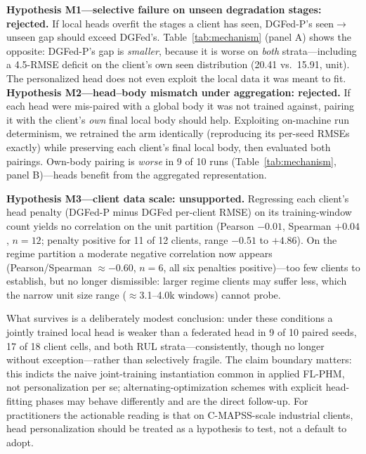\documentclass[journal]{IEEEtran}
\newcommand{\dgfed}{DGFed}
\begin{document}
\textbf{Hypothesis M1---selective failure on unseen degradation stages: rejected.} If local heads overfit the stages a client has seen, \dgfed{}-P's seen$\to$unseen gap should exceed \dgfed{}'s. Table~\ref{tab:mechanism} (panel A) shows the opposite: \dgfed{}-P's gap is \emph{smaller}, because it is worse on \emph{both} strata---including a 4.5-RMSE deficit on the client's own seen distribution (20.41 vs.\ 15.91, unit). The personalized head does not even exploit the local data it was meant to fit.
\textbf{Hypothesis M2---head--body mismatch under aggregation: rejected.} If each head were mis-paired with a global body it was not trained against, pairing it with the client's \emph{own} final local body should help. Exploiting on-machine run determinism, we retrained the arm identically (reproducing its per-seed RMSEs exactly) while preserving each client's final local body, then evaluated both pairings. Own-body pairing is \emph{worse} in 9 of 10 runs (Table~\ref{tab:mechanism}, panel B)---heads benefit from the aggregated representation.

\textbf{Hypothesis M3---client data scale: unsupported.} Regressing each client's head penalty (\dgfed{}-P minus \dgfed{} per-client RMSE) on its training-window count yields no correlation on the unit partition (Pearson $-0.01$, Spearman $+0.04$, $n = 12$; penalty positive for 11 of 12 clients, range $-0.51$ to $+4.86$). On the regime partition a moderate negative correlation now appears (Pearson/Spearman $\approx -0.60$, $n = 6$, all six penalties positive)---too few clients to establish, but no longer dismissible: larger regime clients may suffer less, which the narrow unit size range ($\approx$3.1--4.0k windows) cannot probe.

What survives is a deliberately modest conclusion: under these conditions a jointly trained local head is weaker than a federated head in 9 of 10 paired seeds, 17 of 18 client cells, and both RUL strata---consistently, though no longer without exception---rather than selectively fragile. The claim boundary matters: this indicts the naive joint-training instantiation common in applied FL-PHM, not personalization per se; alternating-optimization schemes \cite{collins2021fedrep} with explicit head-fitting phases may behave differently and are the direct follow-up. For practitioners the actionable reading is that on C-MAPSS-scale industrial clients, head personalization should be treated as a hypothesis to test, not a default to adopt.
\end{document}
